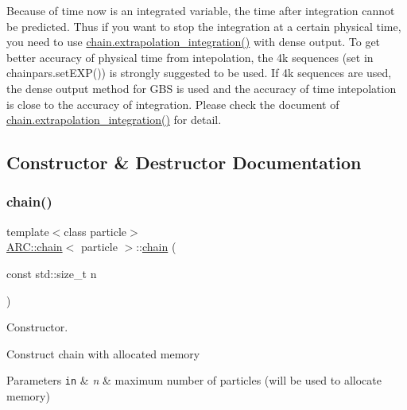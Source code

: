Because of time now is an integrated variable, the time after integration cannot be predicted. Thus if you want to stop the integration at a certain physical time, you need to use \hyperlink{classARC_1_1chain_adedfb41cd82c64ca09dbc55a76b145fc}{chain.\+extrapolation\+\_\+integration()} with dense output. To get better accuracy of physical time from intepolation, the 4k sequences (set in chainpars.\+set\+E\+X\+P()) is strongly suggested to be used. If 4k sequences are used, the dense output method for G\+BS is used and the accuracy of time intepolation is close to the accuracy of integration. Please check the document of \hyperlink{classARC_1_1chain_adedfb41cd82c64ca09dbc55a76b145fc}{chain.\+extrapolation\+\_\+integration()} for detail. 

\subsection{Constructor \& Destructor Documentation}
\hypertarget{classARC_1_1chain_adfb48948fb46b51913dd0a52bee18f2f}{}\label{classARC_1_1chain_adfb48948fb46b51913dd0a52bee18f2f} 
\subsubsection{\texorpdfstring{chain()}{chain()}\hspace{0.1cm}{\footnotesize\ttfamily [1/2]}}
{\footnotesize\ttfamily template$<$class particle$>$ \\
\hyperlink{classARC_1_1chain}{A\+R\+C\+::chain}$<$ particle $>$\+::\hyperlink{classARC_1_1chain}{chain} (\begin{DoxyParamCaption}\item[{const std\+::size\+\_\+t}]{n }\end{DoxyParamCaption})\hspace{0.3cm}{\ttfamily [inline]}}



Constructor. 

Construct chain with allocated memory 
\begin{DoxyParams}[1]{Parameters}
\mbox{\tt in}  & {\em n} & maximum number of particles (will be used to allocate memory) \\
\hline
\end{DoxyParams}
\hypertarget{classARC_1_1chain_a032d2d203f6e6c7d801a37c5d0a7e8d4}{}\label{classARC_1_1chain_a032d2d203f6e6c7d801a37c5d0a7e8d4} 
